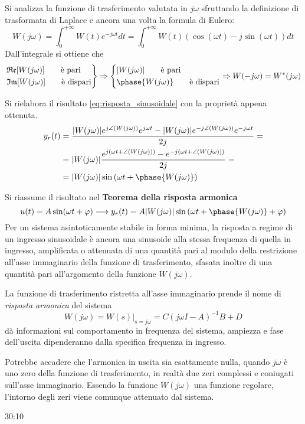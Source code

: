 Si analizza la funzione di trasferimento valutata in $j\omega$ sfruttando la
definizione di trasformata di Laplace e ancora una volta la formula di Eulero:
$$
W(j\omega) = \int_0^{+\infty} W(t) e^{-j\omega t} dt = \int_0^{+\infty} W(t)
\left(\cos(\omega t) - j\sin(\omega t) \right)dt
$$
Dall'integrale si ottiene che
$$\left.\begin{aligned}
&\Re[W(j\omega)] \qquad \text{è pari}\\
&\Im[W(j\omega)] \qquad \text{è dispari}
\end{aligned}\right\}
\Rightarrow\left\{\begin{aligned}
&|W(j\omega)| \qquad \text{è pari} \\
&\phase{W(j\omega)}\qquad \text{è dispari}
\end{aligned}\right. \Rightarrow
W(-j\omega) = W^*(j\omega)
$$

Si rielabora il risultato \ref{eq:risposta_sinusoidale} con la proprietà appena
ottenuta.
$$\begin{aligned}
y_r(t) &= \frac{|W(j\omega)|e^{j\angle{(W(j\omega))}}e^{j\omega t}
- |W(j\omega)|e^{-j\angle({W(j\omega)})}e^{-j\omega t}  }
{2j} =\\
&=
|W(j\omega)|\frac{e^{j(\omega t + \angle(W(j\omega)))} - e^{-j(\omega t +
\angle(W(j\omega)))}}
{2j} = \\
&= |W(j\omega)|\sin\left(\omega t + \phase{W(j\omega)}\right)
\end{aligned}$$

Si riassume il risultato nel \textbf{Teorema della risposta armonica}
$$
u(t) = A\sin(\omega t + \varphi) \longrightarrow y_r(t) =
A|W(j\omega)|\sin\left( \omega t + \phase{W(j\omega)} + \varphi \right)
$$
Per un sistema asintoticamente stabile in forma minima, la risposta a regime di
un ingresso sinusoidale è ancora una sinusoide alla stessa frequenza di quella
in ingresso, amplificata o attenuata di una quantità pari al modulo della
restrizione all'asse immaginario della funzione di trasferimento, sfasata
inoltre di una quantità pari all'argomento della funzione $W(j\omega)$.

La funzione di trasferimento ristretta all'asse immaginario prende il nome di
\textit{risposta armonica} del sistema
$$
W(j\omega) = \left.W(s)\right|_{s=j\omega} = C(j\omega I-A)^{-1}B + D
$$
dà informazioni sul comportamento in frequenza del sistema, ampiezza e fase
dell'uscita dipenderanno dalla specifica frequenza in ingresso.

Potrebbe accadere che l'armonica in uscita sia esattamente nulla, quando
$j\omega$ è uno zero della funzione di trasferimento, in realtà due zeri
complessi e coniugati sull'asse immaginario.
Essendo la funzione $W(j\omega)$ una funzione regolare, l'intorno degli zeri
viene comunque attenuato dal sistema.

30:10
